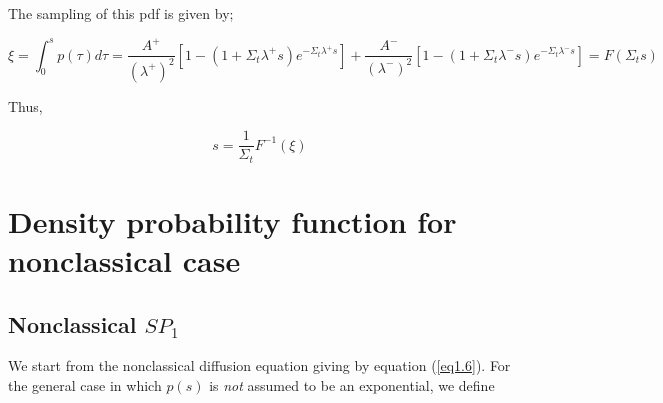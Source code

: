 \documentclass[a4paper, 12pt]{report}
\begin{document}
The sampling of this pdf is given by;

\begin{equation}
\xi = \int_0^s p(\tau) d\tau = \frac{A^+}{(\lambda^+)^2}\left[1 - (1+\Sigma_t\lambda^+s)e^{-\Sigma_t\lambda^+s} \right] + \frac{A^-}{(\lambda^-)^2}\left[1 - (1+\Sigma_t\lambda^-s)e^{-\Sigma_t\lambda^-s} \right] = F(\Sigma_t s) 
\end{equation}

Thus,

\begin{equation}
 s = \frac{1}{\Sigma_t} F^{-1}(\xi)
\end{equation}
\section{Density probability function for nonclassical case}
\subsection{Nonclassical $SP_1$}
We start from the nonclassical diffusion equation giving by equation (\ref{eq1.6}). For the general case in which $p(s)$ is \textit{not} assumed to be an exponential, we define 
\end{document}
